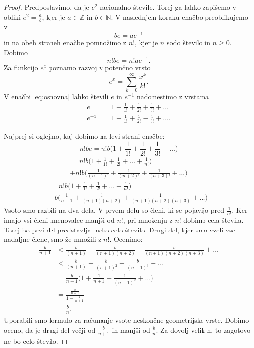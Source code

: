 \documentclass[a4paper]{article}
\makeatletter
\theoremstyle{plain}
\newcommand{\mathleft}{\@fleqntrue\@mathmargin0pt}
\newcommand{\mathcenter}{\@fleqnfalse}
\makeatother
\begin{document}
\begin{proof}
Predpostavimo, da je $e^2$ racionalno število. Torej ga lahko zapišemo v obliki $e^2 = \frac{a}{b}$,
kjer je $a \in \mathbb{Z}$ in $b \in \mathbb{N}$. V naslednjem koraku enačbo preoblikujemo v 
\begin{equation*}
be = ae^{-1}
\end{equation*}
in na obeh straneh enačbe pomnožimo z $n!$, kjer je $n$ sodo število in $n \ge 0$. Dobimo
\begin{equation}
n!be = n!ae^{-1}.
\label{eq:osnovna}
\end{equation}
Za funkcijo $e^x$ poznamo razvoj v potenčno vrsto 
\begin{equation*}
 e^x = \sum_{k=0}^{\infty}\frac{x^k}{k!}.
\end{equation*}
V enačbi \eqref{eq:osnovna} lahko števili $e$ in $e^{-1}$ nadomestimo z vrstama
\begin{align*}
e &= 1+\frac{1}{1!}+\frac{1}{2!}+\frac{1}{3!}+\dots \\
e^{-1}&= 1-\frac{1}{1!}+\frac{1}{2!}-\frac{1}{3!}+\dots. 
\end{align*}

Najprej si oglejmo, kaj dobimo na levi strani enačbe:
\mathleft
\begin{equation*}
n!be = n!b \bigg(1+\frac{1}{1!}+\frac{1}{2!}+\frac{1}{3!}+\dots \bigg) 
\end{equation*}
\mathcenter
\begin{multline*}
=n!b \bigg(1+\frac{1}{1!}+\frac{1}{2!}+\dots+\frac{1}{n!}\bigg) \\
+ n!b \bigg( \frac{1}{(n+1)!}+\frac{1}{(n+2)!}+\frac{1}{(n+3)!}+\dots\bigg)
\end{multline*}
\begin{multline*}
=n!b \bigg(1+\frac{1}{1!}+\frac{1}{2!}+\dots+\frac{1}{n!}\bigg)\\
 + b \bigg( \frac{1}{n+1}+\frac{1}{(n+1)(n+2)}+\frac{1}{(n+1)(n+2)(n+3)}+\dots\bigg)
\end{multline*}
Vsoto smo razbili na dva dela. V prvem delu so členi, ki se pojavijo pred $\frac{1}{n!}$. Ker imajo vsi členi imenovalec manjši od $n!$, pri množenju z $n!$ dobimo cela števila. Torej bo prvi del predstavljal neko celo število. Drugi del, kjer smo vzeli vse nadaljne člene, smo že množili z $n!$. Ocenimo:
\begin{align*}
\frac{b}{n+1} &<\frac{b}{(n+1)}+\frac{b}{(n+1)(n+2)}+\frac{b}{(n+1)(n+2)(n+3)}+\dots \\
&<  \frac{b}{(n+1)}+\frac{b}{(n+1)^2}+\frac{b}{(n+1)^3}+\dots\\
&= \frac{b}{n+1} \bigg(1+\frac{1}{n+1}+\frac{1}{(n+1)^2}+ \dots\bigg) \\
&= \frac{\frac{b}{n+1}}{1-\frac{1}{n+1}}\\
&= \frac{b}{n}.
\end{align*}
Uporabili smo formulo za računanje vsote neskončne geometrijske vrste. Dobimo oceno, da je drugi del večji od $\frac{b}{n+1}$ in manjši od $\frac{b}{n}$. Za dovolj velik n, to zagotovo ne bo celo število.


\end{proof}
\end{document}
